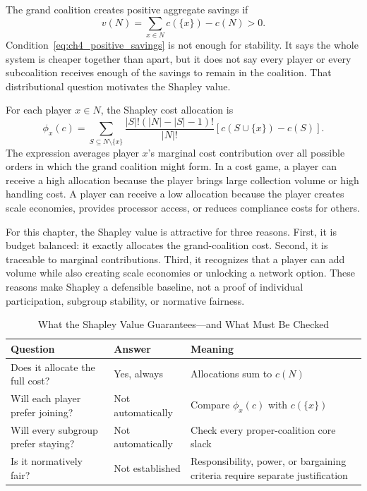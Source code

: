 The grand coalition creates positive aggregate savings if
\begin{equation}
\label{eq:ch4_positive_savings}
v(N)=\sum_{x\in N}c(\{x\})-c(N)>0.
\end{equation}
Condition~\eqref{eq:ch4_positive_savings} is not enough for stability. It says the whole system is cheaper together than apart, but it does not say every player or every subcoalition receives enough of the savings to remain in the coalition. That distributional question motivates the Shapley value.

For each player $x\in N$, the Shapley cost allocation \cite{Shapley1953} is
\begin{equation}
\label{eq:shapley}
\phi_x(c)=
\sum_{S\subseteq N\setminus\{x\}}
\frac{|S|!(|N|-|S|-1)!}{|N|!}
\left[c(S\cup\{x\})-c(S)\right].
\end{equation}
The expression averages player $x$'s marginal cost contribution over all possible orders in which the grand coalition might form. In a cost game, a player can receive a high allocation because the player brings large collection volume or high handling cost. A player can receive a low allocation because the player creates scale economies, provides processor access, or reduces compliance costs for others.

For this chapter, the Shapley value is attractive for three reasons. First, it is budget balanced: it exactly allocates the grand-coalition cost. Second, it is traceable to marginal contributions. Third, it recognizes that a player can add volume while also creating scale economies or unlocking a network option. These reasons make Shapley a defensible baseline, not a proof of individual participation, subgroup stability, or normative fairness.

\begin{table}[htbp]
\centering
\caption{What the Shapley Value Guarantees---and What Must Be Checked}
\label{tab:ch4_shapley_guarantees}
\small
\renewcommand{\arraystretch}{1.15}
\begin{tabular}{@{}>{\raggedright\arraybackslash}p{}>{\raggedright\arraybackslash}p{}>{\raggedright\arraybackslash}p{}@{}}
\toprule
\textbf{Question} & \textbf{Answer} & \textbf{Meaning} \\
\midrule
Does it allocate the full cost? & Yes, always & Allocations sum to $c(N)$ \\
Will each player prefer joining? & Not automatically & Compare $\phi_x(c)$ with $c(\{x\})$ \\
Will every subgroup prefer staying? & Not automatically & Check every proper-coalition core slack \\
Is it normatively fair? & Not established & Responsibility, power, or bargaining criteria require separate justification \\
\bottomrule
\end{tabular}
\normalsize
\end{table}

